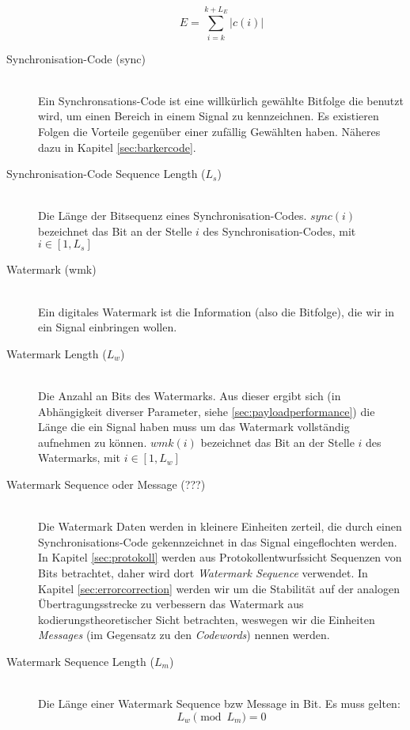\begin{description}
	\begin{equation}
		E = \sum\limits_{i=k}^{k+{L}_{E}}|c(i)| \label{equ:energy}
	\end{equation}
	
	\item[Synchronisation-Code (sync)] \hfill \\ 
	Ein Synchronsations-Code ist eine willk\"urlich gew\"ahlte Bitfolge die benutzt wird, um einen Bereich in einem Signal zu kennzeichnen. Es existieren Folgen die Vorteile gegen\"uber einer zuf\"allig Gew\"ahlten haben. N\"aheres dazu in Kapitel \ref{sec:barkercode}.
	\item[Synchronisation-Code Sequence Length (${L}_{s}$)] \hfill \\
	Die L\"ange der Bitsequenz eines Synchronisation-Codes. $sync(i)$ bezeichnet das Bit an der Stelle $i$ des Synchronisation-Codes, mit $i\in[1,{L}_{s}]$
	\item[Watermark (wmk)] \hfill \\ 
	Ein digitales Watermark ist die Information (also die Bitfolge), die wir in ein Signal einbringen wollen. 
	\item[Watermark Length (${L}_{w}$)] \hfill \\
	Die Anzahl an Bits des Watermarks. Aus dieser ergibt sich (in Abh\"angigkeit diverser Parameter, siehe \ref{sec:payloadperformance}) die L\"ange die ein Signal haben muss um das Watermark vollst\"andig aufnehmen zu k\"onnen. $wmk(i)$ bezeichnet das Bit an der Stelle $i$ des Watermarks, mit $i\in[1,{L}_{w}]$
	\item[Watermark Sequence oder Message (???)] \hfill \\
	Die Watermark Daten werden in kleinere Einheiten zerteil, die durch einen Synchronisations-Code gekennzeichnet in das Signal eingeflochten werden. In Kapitel \ref{sec:protokoll} werden aus Protokollentwurfssicht Sequenzen von Bits betrachtet, daher wird dort \textit{Watermark Sequence} verwendet. In Kapitel \ref{sec:errorcorrection} werden wir um die Stabilit\"at auf der analogen Übertragungsstrecke zu verbessern das Watermark aus kodierungstheoretischer Sicht betrachten, weswegen wir die Einheiten \textit{Messages} (im Gegensatz zu den \textit{Codewords}) nennen werden. 
	\item[Watermark Sequence Length (${L}_{m}$)] \hfill \\
	 Die L\"ange einer Watermark Sequence bzw Message in Bit. Es muss gelten: 
	 \begin{equation}
		 {L}_{w} \pmod{{L}_{m}} = 0 \label{equ:wmkseqlength}
	 \end{equation}
	
\end{description}

